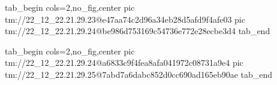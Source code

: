  
 
 
 
 

\qqSecOrig


\ifcmt
  tab_begin cols=2,no_fig,center
    pic tm://22_12_22.21.29.23@e47aa74c2d96a34eb28d5afd9f4afe03
    pic tm://22_12_22.21.29.24@be986d753169c54736e772e28ecbe3d4
  tab_end
\fi


\ifcmt
  tab_begin cols=2,no_fig,center
    pic tm://22_12_22.21.29.24@a6833c9f4fea8afa041972c08731a9e4
    pic tm://22_12_22.21.29.25@7abd7a6dabc852d0cc690ad165eb90ae
  tab_end
\fi

